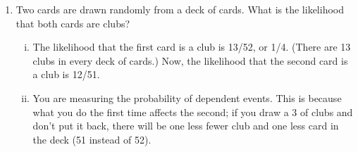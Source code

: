 \documentclass[]{report}
\begin{document}
\begin{enumerate}[(1)]

\item Two cards are drawn randomly from a deck of cards. What is the likelihood that both cards are clubs?
\begin{enumerate}[(i)]
	\item The likelihood that the first card is a club is 13/52, or 1/4. (There are 13 clubs in every deck of cards.) Now, the likelihood that the second card is a club is 12/51.
	\item You are measuring the probability of dependent events. This is because what you do the first time affects the second; if you draw a 3 of clubs and don't put it back, there will be one less fewer club and one less card in the deck (51 instead of 52).
\end{enumerate}



%
%
%
%
%
%
%
%

\end{enumerate}
\end{document}

